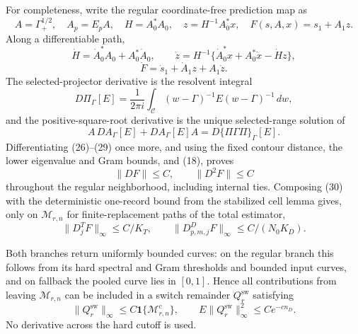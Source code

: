 For completeness, write the regular coordinate-free prediction map as
\[
 A=\Gamma_+^{1/2},\quad A_p=E_pA,\quad H=A_0^*A_0,
 \quad z=H^{-1}A_0^*x,
 \quad F(s,A,x)=s_1+A_1z.                              \tag{25}
\]
Along a differentiable path,
\[
 \dot H=\dot A_0^*A_0+A_0^*\dot A_0,
 \qquad
 \dot z=H^{-1}\{\dot A_0^*x+A_0^*\dot x-\dot Hz\},  \tag{26}
\]
\[
 \dot F=\dot s_1+\dot A_1z+A_1\dot z.                \tag{27}
\]
The selected-projector derivative is the resolvent integral
\[
 D\Pi_\Gamma[E]=\frac{1}{2\pi i}\int_{\mathscr C}
 (w-\Gamma)^{-1}E(w-\Gamma)^{-1}\,dw,                 \tag{28}
\]
and the positive-square-root derivative is the unique selected-range
solution of
\[
 A\,DA_\Gamma[E]+DA_\Gamma[E]A
 =D\{\Pi\Gamma\Pi\}_\Gamma[E].                        \tag{29}
\]
Differentiating (26)--(29) once more, and using the fixed contour distance,
the lower eigenvalue and Gram bounds, and (18), proves
\[
 \|DF\|\leq C,
 \qquad \|D^2F\|\leq C                                \tag{30}
\]
throughout the regular neighborhood, including internal ties.  Composing
(30) with the deterministic one-record bound from the stabilized cell lemma
gives, only on \(\mathcal M_{r,n}\) for finite-replacement paths of the total
estimator,
\[
 \|D_j^TF\|_\infty\leq C/K_T,
 \qquad
 \|D_{p,m,j}^DF\|_\infty\leq C/(N_0K_D).              \tag{31}
\]

Both branches return uniformly bounded curves: on the regular branch this
follows from its hard spectral and Gram thresholds and bounded input curves,
and on fallback the pooled curve lies in \([0,1]\).  Hence all contributions
from leaving \(\mathcal M_{r,n}\) can be included in a switch remainder
\(Q_r^{\mathrm{sw}}\) satisfying
\[
 \|Q_r^{\mathrm{sw}}\|_\infty
 \leq C\mathbf1\{\mathcal M_{r,n}^c\},
 \qquad
 E\|Q_r^{\mathrm{sw}}\|_\infty^2\leq Ce^{-cn_D}.      \tag{32}
\]
No derivative across the hard cutoff is used.

